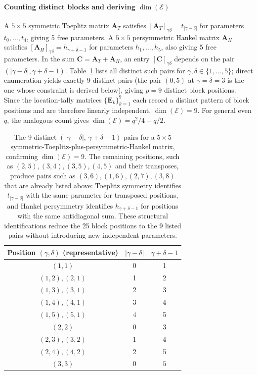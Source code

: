 \documentclass{siamart251216}
\def\bA{\mathbf{A}}
\def\bC{\mathbf{C}}
\def\bE{\mathbf{E}}
\begin{document}
\paragraph{Counting distinct blocks and deriving $\dim(\mathscr{E})$}
A $5\times 5$ symmetric Toeplitz matrix $\bA_T$ satisfies $[\bA_T]_{\gamma\delta} =
t_{|\gamma-\delta|}$ for parameters $t_0,\dots,t_4$, giving 5 free parameters.  A $5\times 5$
persymmetric Hankel matrix $\bA_H$ satisfies $[\bA_H]_{\gamma\delta} = h_{\gamma+\delta-1}$ for
parameters $h_1,\dots,h_5$, also giving 5 free parameters.  In the sum $\bC = \bA_T + \bA_H$,
an entry $[\bC]_{\gamma\delta}$ depends on the pair $(|\gamma-\delta|, \gamma+\delta-1)$.
Table~\ref{tab:pairs} lists all distinct such pairs for $\gamma,\delta\in\{1,\dots,5\}$; direct
enumeration yields exactly 9 distinct pairs (the pair $(0,5)$ at $\gamma=\delta=3$ is the one
whose constraint is derived below), giving $p=9$ distinct block positions.  Since the
location-tally matrices $\{\bE_k\}_{k=1}^9$ each record a distinct pattern of block positions
and are therefore linearly independent, $\dim(\mathscr{E}) = 9$.  For general even $q$, the
analogous count gives $\dim(\mathscr{E}) = q^2/4 + q/2$.

\begin{table}[h]
\centering
\small
\begin{tabular}{ccc}
\toprule
Position $(\gamma,\delta)$ (representative) & $|\gamma-\delta|$ & $\gamma+\delta-1$ \\
\midrule
$(1,1)$ & 0 & 1 \\
$(1,2),(2,1)$ & 1 & 2 \\
$(1,3),(3,1)$ & 2 & 3 \\
$(1,4),(4,1)$ & 3 & 4 \\
$(1,5),(5,1)$ & 4 & 5 \\
$(2,2)$ & 0 & 3 \\
$(2,3),(3,2)$ & 1 & 4 \\
$(2,4),(4,2)$ & 2 & 5 \\
$(3,3)$ & $0$ & $5$ \\
\bottomrule
\end{tabular}
\caption{The 9 distinct $(|\gamma-\delta|,\,\gamma+\delta-1)$ pairs for a $5\times 5$
symmetric-Toeplitz-plus-persymmetric-Hankel matrix, confirming $\dim(\mathscr{E})=9$.
The remaining positions, such as $(2,5),(3,4),(3,5),(4,5)$ and their transposes, produce
pairs such as $(3,6),(1,6),(2,7),(3,8)$ that are already listed above: Toeplitz symmetry
identifies $t_{|\gamma-\delta|}$ with the same parameter for transposed positions, and Hankel
persymmetry identifies $h_{\gamma+\delta-1}$ for positions with the same antidiagonal sum.
These structural identifications reduce the 25 block positions to the 9 listed pairs without
introducing new independent parameters.}
\label{tab:pairs}
\end{table}
\end{document}

